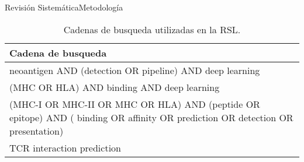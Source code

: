 \documentclass[10pt]{beamer}
\newcommand{\1}{
	\setbeamertemplate{background}{
		\texttt{[image: img/1]}
		\tikz[overlay] \fill[fill opacity=0.75,fill=white] (0,0) rectangle (-\paperwidth,\paperheight);
	}
}
\begin{document}
\begin{frame}{Revisión Sistemática}{Metodología}
	
	\begin{table}[H]
		\begin{center}
			\caption{Cadenas de busqueda utilizadas en la RSL.}
			\label{tab:key_words}
			\setlength{\tabcolsep}{0.5em} %
			{\renewcommand{\arraystretch}{1.4}%
				\begin{tabular}{p{10cm}}
					\textbf{Cadena de busqueda} \\ \hline
					neoantigen  AND (detection OR pipeline) AND deep learning                                                                               \\
					(MHC OR HLA) AND binding  AND deep learning                                                                                             \\				
					(MHC-I OR MHC-II OR MHC OR HLA) AND (peptide OR epitope) AND ( binding OR affinity OR prediction OR detection OR presentation)          \\
					TCR interaction prediction                                                                                                              \\		
				\end{tabular}
			}
		\end{center}
	\end{table}
\end{frame}
\end{document}
